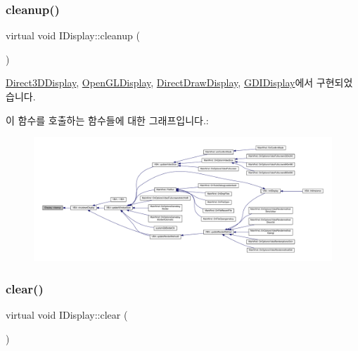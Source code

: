 \subsubsection{\texorpdfstring{cleanup()}{cleanup()}}
{\footnotesize\ttfamily virtual void I\+Display\+::cleanup (\begin{DoxyParamCaption}{ }\end{DoxyParamCaption})\hspace{0.3cm}{\ttfamily [pure virtual]}}



\mbox{\hyperlink{class_direct3_d_display_aabdde19c435c484db2e334eca28a8147}{Direct3\+D\+Display}}, \mbox{\hyperlink{class_open_g_l_display_a870bdc3cf12a50ff23755e1869f9026e}{Open\+G\+L\+Display}}, \mbox{\hyperlink{class_direct_draw_display_a9ef5e33d516c118742d7cf3b52ed28fc}{Direct\+Draw\+Display}}, \mbox{\hyperlink{class_g_d_i_display_ac1bee01ce5982ad75f5d8883133b0ee9}{G\+D\+I\+Display}}에서 구현되었습니다.

이 함수를 호출하는 함수들에 대한 그래프입니다.\+:
\nopagebreak
\begin{figure}[H]
\begin{center}
\leavevmode
\includegraphics[width=350pt]{class_i_display_a039e8c6b3f8fbee485fb895ef70e72c0_icgraph}
\end{center}
\end{figure}
\mbox{\label{class_i_display_affb8a8b5651d138058cdbd088ff3968d}} 
\subsubsection{\texorpdfstring{clear()}{clear()}}
{\footnotesize\ttfamily virtual void I\+Display\+::clear (\begin{DoxyParamCaption}{ }\end{DoxyParamCaption})\hspace{0.3cm}{\ttfamily [pure virtual]}}



